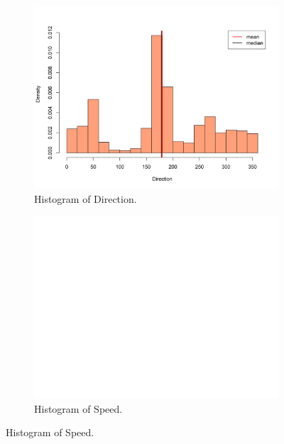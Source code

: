 \documentclass[a4paper, 10pt]{article}
\begin{document}
\begin{figure}[H]
            \vfill
            \begin{subfigure}[t]{0.48\linewidth}
               \centering
               \includegraphics[width=\linewidth]{../images/direction_hist_2019.png}
               \caption{Histogram of Direction.}
            \end{subfigure}
            \hfill
            \begin{subfigure}[t]{0.48\linewidth}
               \centering
               \includegraphics[width=\linewidth]{../images/speed_hist_2019.png}
               \caption{Histogram of Speed.}
            \end{subfigure}
         \end{figure}
         
\end{document}
